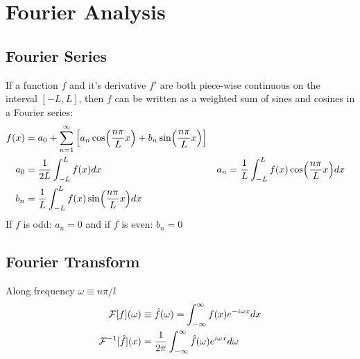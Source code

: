 \section{Fourier Analysis}       
\subsection{Fourier Series}
If a function $f$ and it's derivative $f'$ are both piece-wise continuous on the interval $[-L,L]$, then $f$ can be written as a weighted sum of sines and cosines in a Fourier series:
\begin{align*}
    f(x)
    &=a_0+\sum_{n=1}^\infty \qty[a_n\ft+b_n\ft*]
    \\
    a_0
    &=\oo{2L}\int_{-L}^L f(x)dx
    &
    a_n
    &= \oo{L} \int_{-L}^L f(x)\ft dx
    \\
    b_n
    &= \oo{L} \int_{-L}^L f(x)\ft* dx
\end{align*}
If $f$ is odd: $a_n=0$ and if $f$ is even: $b_n=0$
\subsection{Fourier Transform}
Along frequency $\omega\equiv n\pi/l$
\begin{align*}
    \mathcal{F}[f](\omega)&\equiv\hat{f}(\omega)=\intall f(x)e^{-i\omega x}dx
    \\
    \mathcal{F}^{-1}[\hat{f}](x)&=\oo{2\pi}\intall \hat{f}(\omega)e^{i\omega x}d\omega
\end{align*}
%